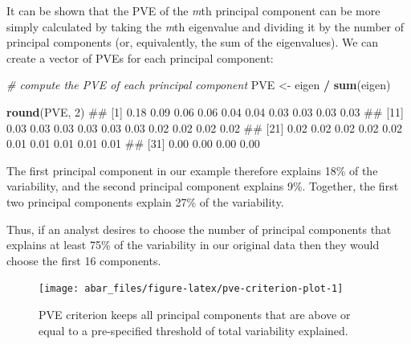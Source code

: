 \documentclass[]{book}
\newenvironment{Shaded}{\begin{snugshade}}{\end{snugshade}}
\newcommand{\CommentTok}[1]{\textcolor[rgb]{0.56,0.35,0.01}{\textit{#1}}}
\newcommand{\DecValTok}[1]{\textcolor[rgb]{0.00,0.00,0.81}{#1}}
\newcommand{\FloatTok}[1]{\textcolor[rgb]{0.00,0.00,0.81}{#1}}
\newcommand{\KeywordTok}[1]{\textcolor[rgb]{0.13,0.29,0.53}{\textbf{#1}}}
\newcommand{\NormalTok}[1]{#1}
\newcommand{\OperatorTok}[1]{\textcolor[rgb]{0.81,0.36,0.00}{\textbf{#1}}}
\newcommand{\StringTok}[1]{\textcolor[rgb]{0.31,0.60,0.02}{#1}}
\theoremstyle{definition}
\theoremstyle{definition}
\theoremstyle{definition}
\theoremstyle{remark}
\begin{document}
It can be shown that the PVE of the \emph{m}th principal component can
be more simply calculated by taking the \emph{m}th eigenvalue and
dividing it by the number of principal components (or, equivalently, the
sum of the eigenvalues). We can create a vector of PVEs for each
principal component:

\begin{Shaded}
\begin{Highlighting}[]
\CommentTok{# compute the PVE of each principal component}
\NormalTok{PVE <-}\StringTok{ }\NormalTok{eigen }\OperatorTok{/}\StringTok{ }\KeywordTok{sum}\NormalTok{(eigen)}

\KeywordTok{round}\NormalTok{(PVE, }\DecValTok{2}\NormalTok{)}
\NormalTok{##  [1] 0.18 0.09 0.06 0.06 0.04 0.04 0.03 0.03 0.03 0.03}
\NormalTok{## [11] 0.03 0.03 0.03 0.03 0.03 0.03 0.02 0.02 0.02 0.02}
\NormalTok{## [21] 0.02 0.02 0.02 0.02 0.02 0.01 0.01 0.01 0.01 0.01}
\NormalTok{## [31] 0.00 0.00 0.00 0.00}
\end{Highlighting}
\end{Shaded}

The first principal component in our example therefore explains 18\% of
the variability, and the second principal component explains 9\%.
Together, the first two principal components explain 27\% of the
variability.

Thus, if an analyst desires to choose the number of principal components
that explains at least 75\% of the variability in our original data then
they would choose the first 16 components.

\begin{Shaded}
\end{Shaded}

\begin{figure}

{\centering \texttt{[image: abar\_files/figure-latex/pve-criterion-plot-1]} 

}

\caption{PVE criterion keeps all principal components that are above or equal to a pre-specified threshold of total variability explained.}\label{fig:pve-criterion-plot}
\end{figure}
\end{document}

